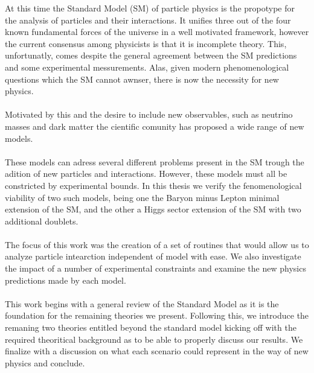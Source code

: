 \documentclass[10pt]{report}
\renewcommand{\(}{\left(}
\renewcommand{\)}{\right)}
\renewcommand{\[}{\left[}
\renewcommand{\]}{\right]}
\begin{document}
\TitlePage
  \vspace*{55mm}
       {%
       At this time the Standard Model (SM) of particle physics is the propotype for the analysis of particles and their interactions. 
       It unifies three out of the four known fundamental forces of the universe in a well motivated framework, however the current consensus among physicists is that it is incomplete theory. 
       This, unfortunatly, comes despite the general agreement between the SM predictions and some experimental messurements. 
       Alas, given modern phenomenological questions which the SM cannot awnser, there is now the necessity for new physics.  
       \\ \ \\ 
       Motivated by this and the desire to include new observables, such as neutrino masses and dark matter the cientific comunity has proposed a wide range of new models. 
       \\ \ \\ 
       These models can adress several different problems present in the SM trough the adition of new particles and interactions. 
       However, these models must all be constricted by experimental bounds. 
       In this thesis we verify the fenomenological viability of two such models, being one the Baryon minus Lepton minimal extension of the SM, and the other a Higgs sector extension of the SM with two additional doublets. 
       \\ \ \\ 
       The focus of this work was the creation of a set of routines that would allow us to analyze particle intearction independent of model with ease. 
       We also investigate the impact of a number of experimental constraints and examine the new physics predictions made by each model. 
       \\ \ \\ 
       This work begins with a general review of the Standard Model as it is the foundation for the remaining theories we present.
       Following this, we introduce the remaning two theories entitled beyond the standard model kicking off with the required theoritical background as to be able to properly discuss our results. 
       We finalize with a discussion on what each scenario could represent in the way of new physics and conclude. 
       }
\EndTitlePage
\titlepage\ \endtitlepage %
\end{document}
